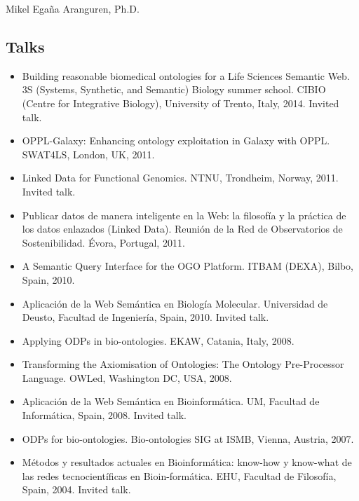 \documentclass[english,11pt,a4paper,oneside]{article}
\begin{document}
\begin{cv}{Mikel Ega\~na Aranguren, Ph.D. }
\subsection*{Talks}
\begin{itemize}
		\item Building reasonable biomedical ontologies for a Life Sciences Semantic Web. 3S (Systems, Synthetic, and Semantic) Biology summer school. CIBIO (Centre for Integrative Biology), University of Trento, Italy, 2014. Invited talk.
		\item OPPL-Galaxy: Enhancing ontology exploitation in Galaxy with OPPL. SWAT4LS, London, UK, 2011.
		\item Linked Data for Functional Genomics. NTNU, Trondheim, Norway, 2011. Invited talk.
		\item Publicar datos de manera inteligente en la Web: la filosof\'ia y la pr\'actica de los datos enlazados (Linked Data). Reuni\'on de la Red de Observatorios de Sostenibilidad. \'Evora, Portugal, 2011. 
		\item A Semantic Query Interface for the OGO Platform. ITBAM (DEXA), Bilbo, Spain, 2010.
		\item Aplicaci\'on de la Web Sem\'antica en Biolog\'ia Molecular. Universidad de Deusto, Facultad de Ingenier\'ia, Spain, 2010. Invited talk.
		\item Applying ODPs in bio-ontologies. EKAW, Catania, Italy, 2008.
		\item Transforming the Axiomisation of Ontologies: The Ontology Pre-Processor Language. OWLed, Washington DC, USA, 2008.
		\item Aplicaci\'on de la Web Sem\'antica en Bioinform\'atica. UM, Facultad de Inform\'atica, Spain, 2008. Invited talk.
		\item ODPs for bio-ontologies. Bio-ontologies SIG at ISMB, Vienna, Austria, 2007.
		\item M\'etodos y resultados actuales en Bioinform\'atica: know-how y know-what de las redes tecnocient\'ificas en Bioin-form\'atica. EHU, Facultad de Filosof\'ia, Spain, 2004. Invited talk.
\end{itemize}


\end{cv}
\end{document}
